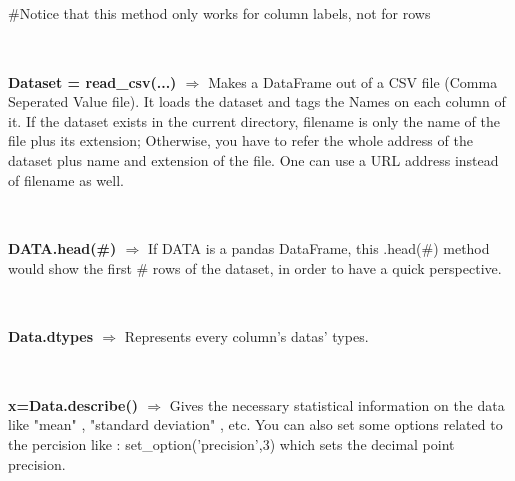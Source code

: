 \documentclass[a4paper,18pt]{article}
\begin{document}
\#Notice that this method only works for column labels, not for rows\\\\


\subsection{\colorbox {matgreen}{\color{white}{\large read\_csv(filename,names=Names)}}}
\textbf{Dataset = read\_csv(...) $\Rightarrow$} Makes a DataFrame out of a CSV file (Comma Seperated Value file). It loads the dataset and tags the Names on each column of it. If the dataset exists in the current directory, filename is only the name of the file plus its extension; Otherwise, you have to refer the whole address of the dataset plus name and extension of the file. One can use a URL address instead of filename as well.\\\\


\subsection{\colorbox {matgreen}{\color{white}{\large DATA.head(\#)}}}
\textbf{DATA.head(\#) $\Rightarrow$} If DATA is a pandas DataFrame, this .head(\#) method would show the first \# rows of the dataset, in order to have a quick perspective.\\\\


\subsection{\colorbox {matgreen}{\color{white}{\large Data.dtypes}}}
\textbf{Data.dtypes $\Rightarrow$} Represents every column's datas' types. \\\\



\subsection{\colorbox {matgreen}{\color{white}{\large Data.describe()}}}
\textbf{x=Data.describe() $\Rightarrow$} Gives the necessary statistical information on the data like "mean" , "standard deviation" , etc. You can also set some options related to the percision like : set\_option('precision',3) which sets the decimal point precision. \\\\
\end{document}
